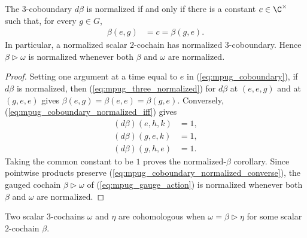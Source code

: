 \begin{lemma}
    \label{thm:mpug_gauge_preserves_normalization}
    \leanok
    The $3$-coboundary $d\beta$ is normalized if and only if there is a
    constant $c\in\C^\times$ such that, for every $g\in G$,
    \begin{align}
        \beta(e,g) & =c=\beta(g,e).
        \label{eq:mpug_coboundary_normalized_iff}
    \end{align}
    In particular, a normalized scalar $2$-cochain has normalized
    $3$-coboundary. Hence $\beta\mathbin{\triangleright}\omega$ is normalized
    whenever both $\beta$ and $\omega$ are normalized.
\end{lemma}
\begin{proof}\leanok
    Setting one argument at a time equal to $e$ in
    (\ref{eq:mpug_coboundary}), if $d\beta$ is normalized, then
    (\ref{eq:mpug_three_normalized}) for $d\beta$ at $(e,e,g)$ and at
    $(g,e,e)$ gives $\beta(e,g)=\beta(e,e)=\beta(g,e)$. Conversely,
    (\ref{eq:mpug_coboundary_normalized_iff}) gives
    \begin{align}
        (d\beta)(e,h,k) & =1, \\
        (d\beta)(g,e,k) & =1, \\
        (d\beta)(g,h,e) & =1.
        \label{eq:mpug_coboundary_normalized_converse}
    \end{align}
    Taking the common constant to be $1$ proves the normalized-$\beta$
    corollary. Since pointwise products preserve
    (\ref{eq:mpug_coboundary_normalized_converse}), the gauged cochain
    $\beta\mathbin{\triangleright}\omega$ of (\ref{eq:mpug_gauge_action}) is
    normalized whenever both $\beta$ and $\omega$ are normalized.
\end{proof}

\begin{definition}
    \label{def:mpug_cohomologous_to}
    \leanok
    Two scalar $3$-cochains $\omega$ and $\eta$ are cohomologous when
    $\omega=\beta\mathbin{\triangleright}\eta$ for some scalar
    $2$-cochain $\beta$.
\end{definition}

